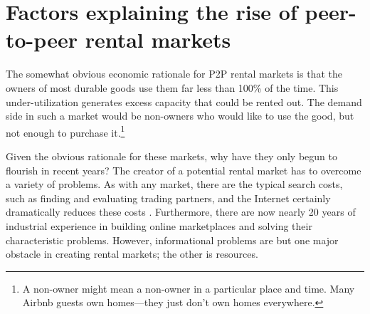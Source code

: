 \documentclass[11pt]{article}
\begin{document}
 



\section{Factors explaining the rise of peer-to-peer rental markets}

The somewhat obvious economic rationale for P2P rental markets is that the owners of most durable goods use them far less than 100\% of the time.
This under-utilization generates excess capacity that could be rented out.
The demand side in such a market would be non-owners who would like to use the good, but not enough to purchase it.\footnote{
A non-owner might mean a non-owner in a particular place and time. 
Many Airbnb guests own homes---they just don't own homes everywhere. 
} 

Given the obvious rationale for these markets, why have they only begun to flourish in recent years? 
The creator of a potential rental market has to overcome a variety of problems. 
As with any market, there are the typical search costs, such as finding and evaluating trading partners, and the Internet certainly dramatically reduces these costs \citep{bakos1997reducing}.
Furthermore, there are now nearly 20 years of industrial experience in building online marketplaces and solving their characteristic problems. 
However, informational problems are but one major obstacle in creating rental markets; the other is resources. 

\end{document}

